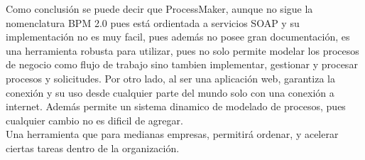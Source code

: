Como conclusión se puede decir que ProcessMaker, aunque no sigue la nomenclatura BPM 2.0  pues está ordientada a servicios SOAP y su implementación no es muy facil, pues además no  posee gran documentación,  es una herramienta robusta para utilizar, pues no solo permite modelar los procesos de negocio como flujo de trabajo sino tambien implementar, gestionar y procesar procesos y solicitudes. Por otro lado, al ser una aplicación web, garantiza la conexión y su uso desde cualquier parte del mundo solo con  una conexión a internet. Además permite un sistema dinamico de modelado de procesos, pues cualquier cambio no es dificil de agregar.
\\
Una herramienta que para medianas empresas, permitirá ordenar, y acelerar ciertas tareas dentro de la organización.